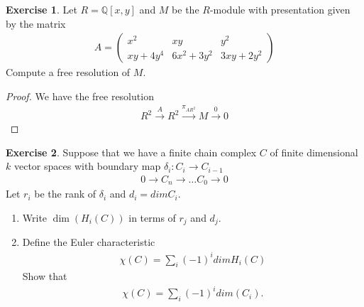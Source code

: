 \documentclass[12pt]{extarticle}
\newcommand{\Q}{\mathbb{Q}}
\newcommand{\<}{\langle}
\renewcommand{\>}{\rangle}
\theoremstyle{definition}
\newtheorem{exercise}{Exercise}
\begin{document}
\begin{exercise}
  Let $R= \Q[x,y]$ and $M$ be the $R$-module with presentation given by the matrix
  \begin{align*}
    A =
    \begin{pmatrix}
      x^2     & xy          & y^2 \\
      xy+4y^4 & 6x^2 + 3y^2 & 3xy + 2y^2  
    \end{pmatrix}
  \end{align*}
  Compute a free resolution of $M$.
\end{exercise}
\begin{proof}
  We have the free resolution
  \begin{align*}
    R^2 \xrightarrow{A} R^2 \xrightarrow{\pi_{AR^2}} M \xrightarrow{0} 0 
  \end{align*}
\end{proof}
\begin{exercise}
  Suppose that we have a finite chain complex $C$ of finite dimensional $k$ vector spaces with boundary map $\delta_i: C_i \to C_{i-1}$
  \begin{align*}
    0 \to C_n \to \dots C_0 \to 0
  \end{align*}
  Let $r_i$ be the rank of $\delta_i$ and $d_i = dim C_i $.
    \begin{enumerate}
    \item
      Write $\dim(H_i(C))$ in terms of $r_j$ and $d_j$.
    \item
      Define the Euler characteristic
      \begin{align*}
        \chi(C) = \sum\limits_{i} (-1)^i dim H_i(C)
      \end{align*}
      Show that
      \begin{align*}
        \chi(C) = \sum\limits_{i} (-1)^i dim (C_i).
      \end{align*}
    \end{enumerate}
\end{exercise}
\end{document}
